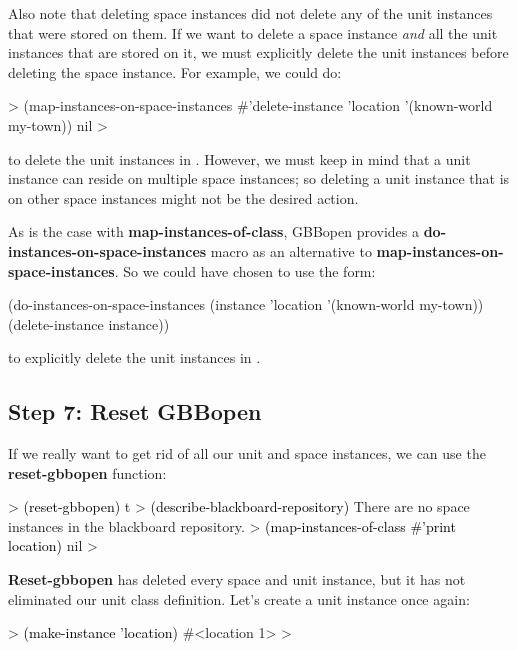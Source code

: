 \documentclass[10pt,twoside,english,pdftex]{article}
\begin{document}
%
%
Also note that deleting space instances did not delete any of the unit
instances that were stored on them.  If we want to delete a space instance
\textit{and\/} all the unit instances that are stored on it, we must
explicitly delete the unit instances before deleting the space instance.
For example, we could do:
%
\begin{example}\color{darkergray}%
  > (map-instances-on-space-instances #'delete-instance 
      'location '(known-world my-town))
  nil
  >
\end{example}
%
to delete the unit instances in .  However, we must keep in mind
that a unit instance can reside on multiple space instances; so deleting a
unit instance that is on other space instances might not be the desired
action.

%
As is the case with \textbf{map-instances-of-class}, GBBopen provides a
\textbf{do-instances-on-space-instances} macro as an alternative to
\textbf{map-instances-on-space-instances}.  So we could have chosen to use the
form:
%
\begin{example}\color{darkergray}%
  (do-instances-on-space-instances (instance 'location '(known-world my-town))
    (delete-instance instance))
\end{example}
%
to explicitly delete the  unit instances in .

\subsection*{Step 7: Reset GBBopen}

%
%
%
If we really want to get rid of all our unit and space instances, we can use
the \textbf{reset-gbbopen} function:
%
\begin{example}\color{darkergray}%
  > \textcolor{black}{(reset-gbbopen)}
  t
  > \textcolor{black}{(describe-blackboard-repository)}
  There are no space instances in the blackboard repository.
  > \textcolor{black}{(map-instances-of-class #'print location)}
  nil
  >
\end{example}

%
\textbf{Reset-gbbopen} has deleted every space and unit instance, but it has
not eliminated our  unit class definition.  Let's create
a  unit instance once again:
%
\begin{example}\color{darkergray}%
  > \textcolor{black}{(make-instance 'location)}
  #<location 1>
  >
\end{example}
\end{document}

